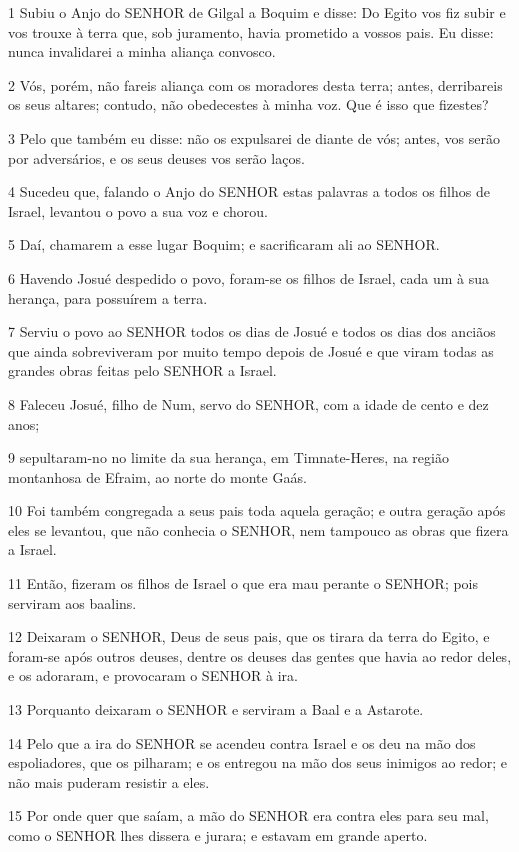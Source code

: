 \par 1 Subiu o Anjo do SENHOR de Gilgal a Boquim e disse: Do Egito vos fiz subir e vos trouxe à terra que, sob juramento, havia prometido a vossos pais. Eu disse: nunca invalidarei a minha aliança convosco.
\par 2 Vós, porém, não fareis aliança com os moradores desta terra; antes, derribareis os seus altares; contudo, não obedecestes à minha voz. Que é isso que fizestes?
\par 3 Pelo que também eu disse: não os expulsarei de diante de vós; antes, vos serão por adversários, e os seus deuses vos serão laços.
\par 4 Sucedeu que, falando o Anjo do SENHOR estas palavras a todos os filhos de Israel, levantou o povo a sua voz e chorou.
\par 5 Daí, chamarem a esse lugar Boquim; e sacrificaram ali ao SENHOR.
\par 6 Havendo Josué despedido o povo, foram-se os filhos de Israel, cada um à sua herança, para possuírem a terra.
\par 7 Serviu o povo ao SENHOR todos os dias de Josué e todos os dias dos anciãos que ainda sobreviveram por muito tempo depois de Josué e que viram todas as grandes obras feitas pelo SENHOR a Israel.
\par 8 Faleceu Josué, filho de Num, servo do SENHOR, com a idade de cento e dez anos;
\par 9 sepultaram-no no limite da sua herança, em Timnate-Heres, na região montanhosa de Efraim, ao norte do monte Gaás.
\par 10 Foi também congregada a seus pais toda aquela geração; e outra geração após eles se levantou, que não conhecia o SENHOR, nem tampouco as obras que fizera a Israel.
\par 11 Então, fizeram os filhos de Israel o que era mau perante o SENHOR; pois serviram aos baalins.
\par 12 Deixaram o SENHOR, Deus de seus pais, que os tirara da terra do Egito, e foram-se após outros deuses, dentre os deuses das gentes que havia ao redor deles, e os adoraram, e provocaram o SENHOR à ira.
\par 13 Porquanto deixaram o SENHOR e serviram a Baal e a Astarote.
\par 14 Pelo que a ira do SENHOR se acendeu contra Israel e os deu na mão dos espoliadores, que os pilharam; e os entregou na mão dos seus inimigos ao redor; e não mais puderam resistir a eles.
\par 15 Por onde quer que saíam, a mão do SENHOR era contra eles para seu mal, como o SENHOR lhes dissera e jurara; e estavam em grande aperto.
